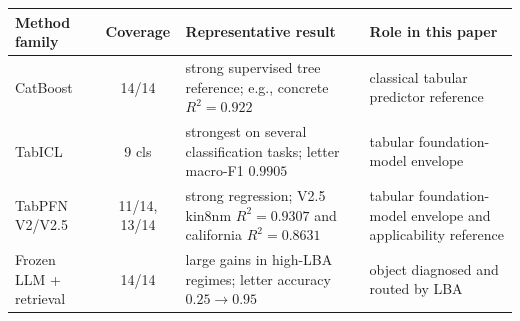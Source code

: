 \begin{tabularx}{\textwidth}{lclX}
\toprule
Method family & Coverage & Representative result & Role in this paper \\
\midrule
CatBoost & 14/14 & strong supervised tree reference; e.g., concrete $R^2=0.922$ & classical tabular predictor reference \\
TabICL & 9 cls & strongest on several classification tasks; letter macro-F1 $0.9905$ & tabular foundation-model envelope \\
TabPFN V2/V2.5 & 11/14, 13/14 & strong regression; V2.5 kin8nm $R^2=0.9307$ and california $R^2=0.8631$ & tabular foundation-model envelope and applicability reference \\
Frozen LLM + retrieval & 14/14 & large gains in high-LBA regimes; letter accuracy $0.25\to0.95$ & object diagnosed and routed by LBA \\
\bottomrule
\end{tabularx}
